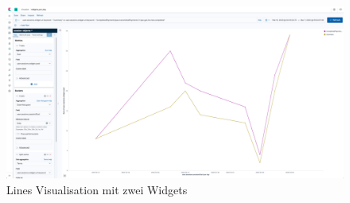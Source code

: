 \begin{figure}[htb]
\begin{center}
	\includegraphics[width=430pt]{bilder/screen_lines.png}
\end{center}
\caption{Lines Visualisation mit zwei Widgets}
\label{fig:screen_lines}
\end{figure}




\clearpage
